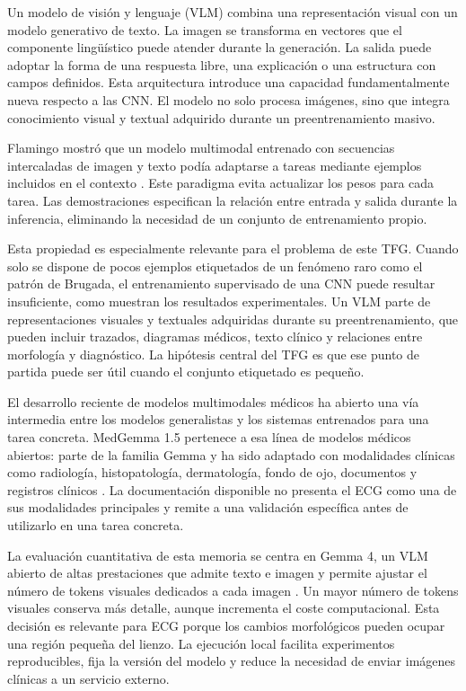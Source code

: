 Un modelo de visión y lenguaje (VLM) combina una representación visual con un modelo generativo de texto. La imagen se transforma en vectores que el componente lingüístico puede atender durante la generación. La salida puede adoptar la forma de una respuesta libre, una explicación o una estructura con campos definidos. Esta arquitectura introduce una capacidad fundamentalmente nueva respecto a las CNN. El modelo no solo procesa imágenes, sino que integra conocimiento visual y textual adquirido durante un preentrenamiento masivo.

Flamingo mostró que un modelo multimodal entrenado con secuencias intercaladas de imagen y texto podía adaptarse a tareas mediante ejemplos incluidos en el contexto \cite{alayrac2022}. Este paradigma evita actualizar los pesos para cada tarea. Las demostraciones especifican la relación entre entrada y salida durante la inferencia, eliminando la necesidad de un conjunto de entrenamiento propio.

Esta propiedad es especialmente relevante para el problema de este TFG. Cuando solo se dispone de pocos ejemplos etiquetados de un fenómeno raro como el patrón de Brugada, el entrenamiento supervisado de una CNN puede resultar insuficiente, como muestran los resultados experimentales. Un VLM parte de representaciones visuales y textuales adquiridas durante su preentrenamiento, que pueden incluir trazados, diagramas médicos, texto clínico y relaciones entre morfología y diagnóstico. La hipótesis central del TFG es que ese punto de partida puede ser útil cuando el conjunto etiquetado es pequeño.

El desarrollo reciente de modelos multimodales médicos ha abierto una vía intermedia entre los modelos generalistas y los sistemas entrenados para una tarea concreta. MedGemma 1.5 pertenece a esa línea de modelos médicos abiertos: parte de la familia Gemma y ha sido adaptado con modalidades clínicas como radiología, histopatología, dermatología, fondo de ojo, documentos y registros clínicos \cite{medgemma15}. La documentación disponible no presenta el ECG como una de sus modalidades principales y remite a una validación específica antes de utilizarlo en una tarea concreta.

La evaluación cuantitativa de esta memoria se centra en Gemma 4, un VLM abierto de altas prestaciones que admite texto e imagen y permite ajustar el número de tokens visuales dedicados a cada imagen \cite{gemma4card}. Un mayor número de tokens visuales conserva más detalle, aunque incrementa el coste computacional. Esta decisión es relevante para ECG porque los cambios morfológicos pueden ocupar una región pequeña del lienzo. La ejecución local facilita experimentos reproducibles, fija la versión del modelo y reduce la necesidad de enviar imágenes clínicas a un servicio externo.


